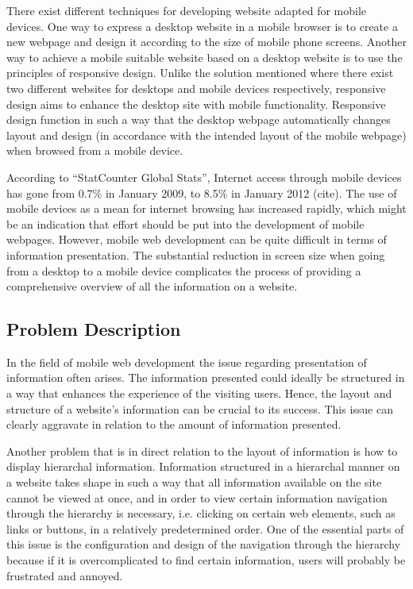 There exist different techniques for developing website adapted for mobile devices. One way to express a desktop website in a mobile browser is to create a new webpage and design it according to the size of mobile phone screens. Another way to achieve a mobile suitable website based on a desktop website is to use the principles of responsive design. Unlike the solution mentioned where there exist two different websites for desktops and mobile devices respectively, responsive design aims to enhance the desktop site with mobile functionality. Responsive design function in such a way that the desktop webpage automatically changes layout and design (in accordance with the intended layout of the mobile webpage) when browsed from a mobile device.

According to “StatCounter Global Stats”, Internet access through mobile devices has gone from 0.7\% in January 2009, to 8.5\% in January 2012 (cite). The use of mobile devices as a mean for internet browsing has increased rapidly, which might be an indication that effort should be put into the development of mobile webpages. However, mobile web development can be quite difficult in terms of information presentation. The substantial reduction in screen size when going from a desktop to a mobile device complicates the process of providing a comprehensive overview of all the information on a website.




\subsection{Problem Description}
In the field of mobile web development the issue regarding presentation of information often arises. The information presented could ideally be structured in a way that enhances the experience of the visiting users. Hence, the layout and structure of a website’s information can be crucial to its success. This issue can clearly aggravate in relation to the amount of information presented. 

Another problem that is in direct relation to the layout of information is how to display hierarchal information. Information structured in a hierarchal manner on a website takes shape in such a way that all information available on the site cannot be viewed at once, and in order to view certain information navigation through the hierarchy is necessary, i.e. clicking on certain web elements, such as links or buttons, in a relatively predetermined order. One of the essential parts of this issue is the configuration and design of the navigation through the hierarchy because if it is overcomplicated to find certain information, users will probably be frustrated and annoyed. 

